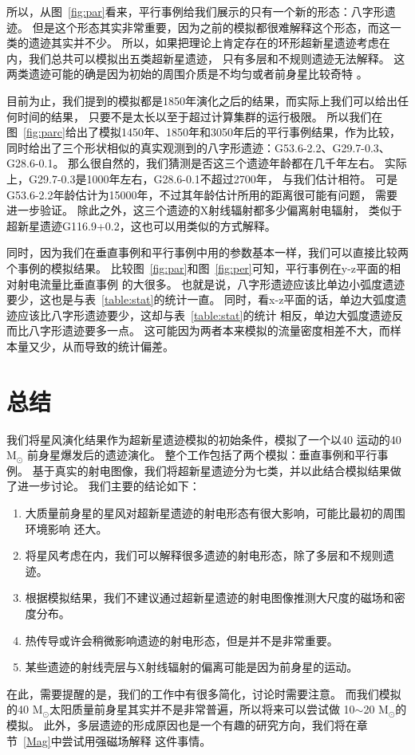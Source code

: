 所以，从图~\ref{fig:par}看来，平行事例给我们展示的只有一个新的形态：八字形遗迹。
但是这个形态其实非常重要，因为之前的模拟都很难解释这个形态，而这一类的遗迹其实并不少。
所以，如果把理论上肯定存在的环形超新星遗迹考虑在内，我们总共可以模拟出五类超新星遗迹，
只有多层和不规则遗迹无法解释。
这两类遗迹可能的确是因为初始的周围介质是不均匀或者前身星比较奇特
\citep{Orlando2007,Orlando2017}。

目前为止，我们提到的模拟都是1850年演化之后的结果，而实际上我们可以给出任何时间的结果，
只要不是太长以至于超过计算集群的运行极限。
所以我们在图~\ref{fig:parc}给出了模拟1450年、1850年和3050年后的平行事例结果，作为比较，
同时给出了三个形状相似的真实观测到的八字形遗迹：G53.6-2.2、G29.7-0.3、G28.6-0.1。
那么很自然的，我们猜测是否这三个遗迹年龄都在几千年左右。
实际上，G29.7-0.3是1000年左右\citep{Leahy2008}，G28.6-0.1不超过2700年\citep{Bamba2001}，
与我们估计相符。
可是G53.6-2.2年龄估计为15000年\citet{Long1991}，不过其年龄估计所用的距离很可能有问题，
需要进一步验证。
除此之外，这三个遗迹的X射线辐射都多少偏离射电辐射\citep{Broersen2015,Su2009,Bamba2001}，
类似于超新星遗迹G116.9+0.2，这也可以用类似的方式解释。

同时，因为我们在垂直事例和平行事例中用的参数基本一样，我们可以直接比较两个事例的模拟结果。
比较图~\ref{fig:par}和图~\ref{fig:per}可知，平行事例在y-z平面的相对射电流量比垂直事例
的大很多。
也就是说，八字形遗迹应该比单边小弧度遗迹要少，这也是与表~\ref{table:stat}的统计一直。
同时，看x-z平面的话，单边大弧度遗迹应该比八字形遗迹要少，这却与表~\ref{table:stat}的统计
相反，单边大弧度遗迹反而比八字形遗迹要多一点。
这可能因为两者本来模拟的流量密度相差不大，而样本量又少，从而导致的统计偏差。

\section{总结}
\label{SWsum}
我们将星风演化结果作为超新星遗迹模拟的初始条件，模拟了一个以40 \kms 运动的40 M$_{\odot}$
前身星爆发后的遗迹演化。
整个工作包括了两个模拟：垂直事例和平行事例。
基于真实的射电图像，我们将超新星遗迹分为七类，并以此结合模拟结果做了进一步讨论。
我们主要的结论如下：

\begin{enumerate}

    \item 大质量前身星的星风对超新星遗迹的射电形态有很大影响，可能比最初的周围环境影响
    还大。

    \item 将星风考虑在内，我们可以解释很多遗迹的射电形态，除了多层和不规则遗迹。

    \item 根据模拟结果，我们不建议通过超新星遗迹的射电图像推测大尺度的磁场和密度分布。

    \item 热传导或许会稍微影响遗迹的射电形态，但是并不是非常重要。

    \item 某些遗迹的射线壳层与X射线辐射的偏离可能是因为前身星的运动。

\end{enumerate}

在此，需要提醒的是，我们的工作中有很多简化，讨论时需要注意。
而我们模拟的40 M$_{\odot}$太阳质量前身星其实并不是非常普遍，所以将来可以尝试做
10$\sim$20 M$_{\odot}$的模拟。
此外，多层遗迹的形成原因也是一个有趣的研究方向，我们将在章节~\ref{Mag}中尝试用强磁场解释
这件事情。
